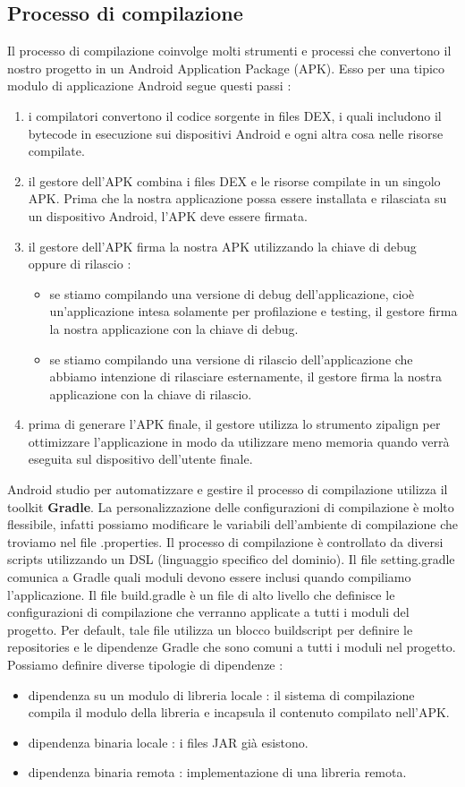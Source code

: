 \documentclass[12pt]{report}
\begin{document}
\subsection{Processo di compilazione}
Il processo di compilazione coinvolge molti strumenti e processi che convertono il nostro progetto in un Android Application Package (APK). Esso per una tipico modulo di applicazione Android segue questi passi :
\begin{enumerate}
\item i compilatori convertono il codice sorgente in files DEX, i quali includono il bytecode in esecuzione sui dispositivi Android e ogni altra cosa nelle risorse compilate.
\item il gestore dell'APK combina i files DEX e le risorse compilate in un singolo APK. Prima che la nostra applicazione possa essere installata e rilasciata su un dispositivo Android, l'APK deve essere firmata.
\item il gestore dell'APK firma la nostra APK utilizzando la chiave di debug oppure di rilascio :
\begin{itemize}
\item se stiamo compilando una versione di debug dell'applicazione, cioè un'applicazione intesa solamente per profilazione e testing, il gestore firma la nostra applicazione con la chiave di debug.
\item se stiamo compilando una versione di rilascio dell'applicazione che abbiamo intenzione di rilasciare esternamente, il gestore firma la nostra applicazione con la chiave di rilascio.
\end{itemize}
\item prima di generare l'APK finale, il gestore utilizza lo strumento zipalign per ottimizzare l'applicazione in modo da utilizzare meno memoria quando verrà eseguita sul dispositivo dell'utente finale.
\end{enumerate}
Android studio per automatizzare e gestire il processo di compilazione utilizza il toolkit \textbf{Gradle}. La personalizzazione delle configurazioni di compilazione è molto flessibile, infatti possiamo modificare le variabili dell'ambiente di compilazione che troviamo nel file .properties. Il processo di compilazione è controllato da diversi scripts utilizzando un DSL (linguaggio specifico del dominio). Il file setting.gradle comunica a Gradle quali moduli devono essere inclusi quando compiliamo l'applicazione. Il file build.gradle è un file di alto livello che definisce le configurazioni di compilazione che verranno applicate a tutti i moduli del progetto. Per default, tale file utilizza un blocco buildscript per definire le repositories e le dipendenze Gradle che sono comuni a tutti i moduli nel progetto. Possiamo definire diverse tipologie di dipendenze :
\begin{itemize}
\item dipendenza su un modulo di libreria locale : il sistema di compilazione compila il modulo della libreria e incapsula il contenuto compilato nell'APK.
\item dipendenza binaria locale : i files JAR già esistono.
\item dipendenza binaria remota : implementazione di una libreria remota.
\end{itemize}
\end{document}
